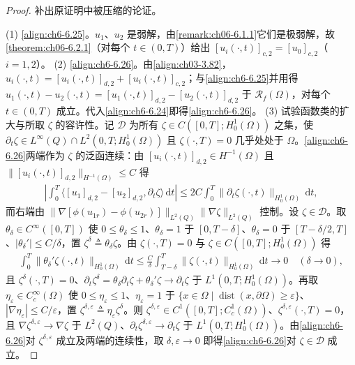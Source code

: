 \documentclass[../../main.tex]{subfiles}%
\begin{document}
\begin{proof}
补出原证明中被压缩的论证。

(1) \eqref{align:ch6-6.25}。$u_1$、$u_2$ 是弱解，由\cref{remark:ch06-6.1.1}它们是极弱解，故\cref{theorem:ch06-6.2.1}（对每个 $t\in(0,T)$）给出 $[u_i(\cdot,t)]_{c,2}=[u_0]_{c,2}$（$i=1,2$）。
(2) \eqref{align:ch6-6.26}。由\eqref{align:ch03-3.82}，$u_i(\cdot,t)=[u_i(\cdot,t)]_{d,2}+[u_i(\cdot,t)]_{c,2}$；与\eqref{align:ch6-6.25}并用得 $u_1(\cdot,t)-u_2(\cdot,t)=[u_1(\cdot,t)]_{d,2}-[u_2(\cdot,t)]_{d,2}$ 于 $\mathscr{R}_f(\Omega)$，对每个 $t\in(0,T)$ 成立。代入\eqref{align:ch6-6.24}即得\eqref{align:ch6-6.26}。
(3) 试验函数类的扩大与所取 $\zeta$ 的容许性。记 $\mathscr{D}$ 为所有 $\zeta\in C([0,T];H^1_0(\Omega))$ 之集，使 $\partial_t\zeta\in L^\infty(Q)\cap L^2(0,T;H^1_0(\Omega))$ 且 $\zeta(\cdot,T)=0$ 几乎处处于 $\Omega$。\eqref{align:ch6-6.26}两端作为 $\zeta$ 的泛函连续：由 $[u_i(\cdot,t)]_{d,2}\in H^{-1}(\Omega)$ 且 $\|[u_i(\cdot,t)]_{d,2}\|_{H^{-1}(\Omega)}\leqslant C$ 得
\begin{align*}
\left|\int_0^T\langle[u_1]_{d,2}-[u_2]_{d,2},\partial_t\zeta\rangle\,\mathrm{d}t\right|
\leqslant 2C\int_0^T\|\partial_t\zeta(\cdot,t)\|_{H^1_0(\Omega)}\,\mathrm{d}t,
\end{align*}
而右端由 $\|\nabla[\phi(u_{1r})-\phi(u_{2r})]\|_{L^2(Q)}\|\nabla\zeta\|_{L^2(Q)}$ 控制。设 $\zeta\in\mathscr{D}$。取 $\theta_\delta\in C^\infty([0,T])$ 使 $0\leqslant\theta_\delta\leqslant1$、$\theta_\delta=1$ 于 $[0,T-\delta]$、$\theta_\delta=0$ 于 $[T-\delta/2,T]$、$|\theta_\delta'|\leqslant C/\delta$，置 $\zeta^\delta\triangleq\theta_\delta\zeta$。由 $\zeta(\cdot,T)=0$ 与 $\zeta\in C([0,T];H^1_0(\Omega))$ 得
\begin{align*}
\int_0^T\|\theta_\delta'\zeta(\cdot,t)\|_{H^1_0(\Omega)}\,\mathrm{d}t
\leqslant\frac{C}{\delta}\int_{T-\delta}^T\|\zeta(\cdot,t)\|_{H^1_0(\Omega)}\,\mathrm{d}t\to0
\quad(\delta\to0),
\end{align*}
且 $\zeta^\delta(\cdot,T)=0$、$\partial_t\zeta^\delta=\theta_\delta\partial_t\zeta+\theta_\delta'\zeta\to\partial_t\zeta$ 于 $L^1(0,T;H^1_0(\Omega))$。再取 $\eta_\varepsilon\in C^\infty_c(\Omega)$ 使 $0\leqslant\eta_\varepsilon\leqslant1$、$\eta_\varepsilon=1$ 于 $\{x\in\Omega\mid\operatorname{dist}(x,\partial\Omega)\geqslant\varepsilon\}$、$|\nabla\eta_\varepsilon|\leqslant C/\varepsilon$，置 $\zeta^{\delta,\varepsilon}\triangleq\eta_\varepsilon\zeta^\delta$。则 $\zeta^{\delta,\varepsilon}\in C^1([0,T];C^1_c(\Omega))$、$\zeta^{\delta,\varepsilon}(\cdot,T)=0$，且 $\nabla\zeta^{\delta,\varepsilon}\to\nabla\zeta$ 于 $L^2(Q)$、$\partial_t\zeta^{\delta,\varepsilon}\to\partial_t\zeta$ 于 $L^1(0,T;H^1_0(\Omega))$。由\eqref{align:ch6-6.26}对 $\zeta^{\delta,\varepsilon}$ 成立及两端的连续性，取 $\delta,\varepsilon\to0$ 即得\eqref{align:ch6-6.26}对 $\zeta\in\mathscr{D}$ 成立。

\end{proof}
\end{document}
